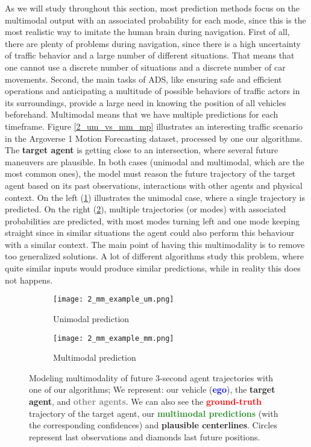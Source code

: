 As we will study throughout this section, most prediction methods focus on the multimodal output with an associated probability for each mode, since this is the most realistic way to imitate the human brain during navigation. First of all, there are plenty of problems during navigation, since there is a high uncertainty of traffic behavior and a large number of different situations. That means that one cannot use a discrete number of situations and a discrete number of car movements. Second, the main tasks of \ac{ADS}, like ensuring safe and efficient operations and anticipating a multitude of possible behaviors of traffic actors in its surroundings, provide a large need in knowing the position of all vehicles beforehand. Multimodal means that we have multiple predictions for each timeframe. Figure \ref{2_um_vs_mm_mp} illustrates an interesting traffic scenario in the Argoverse 1 \cite{chang2019argoverse} Motion Forecasting dataset, processed by one our algorithms. The \textbf{\textcolor{YellowOrange}{target agent}} is getting close to an intersection, where several future maneuvers are plausible. In both cases (unimodal and multimodal, which are the most common ones), the model must reason the future trajectory of the target agent based on its past observations, interactions with other agents and physical context. On the left (\ref{fig:2_um_vs_mm_mp_a}) illustrates the unimodal case, where a single trajectory is predicted. On the right (\ref{fig:2_um_vs_mm_mp_b}), multiple trajectories (or modes) with associated probabilities are predicted, with most modes turning left and one mode keeping straight since in similar situations the agent could also perform this behaviour with a similar context. The main point of having this multimodality is to remove too generalized solutions. A lot of different algorithms study this problem, where quite similar inputs would produce similar predictions, while in reality this does not happens.

\begin{figure}[t!]
	\begin{subfigure}{0.5\textwidth}
		\texttt{[image: 2\_mm\_example\_um.png]}
		\caption{Unimodal prediction}
		\label{fig:2_um_vs_mm_mp_a}
	\end{subfigure}
	\hfill
	\begin{subfigure}{0.5\textwidth}
		\texttt{[image: 2\_mm\_example\_mm.png]}
		\caption{Multimodal prediction}
		\label{fig:2_um_vs_mm_mp_b}
	\end{subfigure}

	\caption[Modeling multimodality of future $3$-second agent trajectories with one of our algorithms]{Modeling multimodality of future $3$-second agent trajectories with one of our algorithms; We represent: our vehicle (\textbf{\textcolor{blue}{ego}}), the \textbf{\textcolor{YellowOrange}{target agent}}, and \textbf{\textcolor{gray}{other agents}}. We can also see the \textbf{\textcolor{red}{ground-truth}} trajectory of the target agent, our \textbf{\textcolor{ForestGreen}{multimodal predictions}} (with the corresponding confidences) and \textbf{plausible centerlines}. Circles represent last observations and diamonds last future positions.}
	\label{fig:2_um_vs_mm_mp}
\end{figure}

